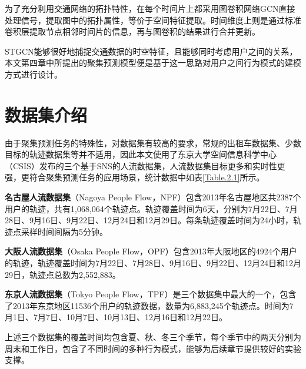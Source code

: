 \documentclass[master]{thesis-uestc}
\begin{document}
为了充分利用交通网络的拓扑特性，在每个时间片上都采用图卷积网络GCN直接处理信号，提取图中的拓扑属性，等价于空间特征提取。时间维度上则是通过标准卷积层提取节点相邻时间片的信息，再与图卷积的结果进行合并更新。

STGCN能够很好地捕捉交通数据的时空特征，且能够同时考虑用户之间的关系，本文第四章中所提出的聚集预测模型便是基于这一思路对用户之间行为模式的建模方式进行设计。

\section{数据集介绍}
由于聚集预测任务的特殊性，对数据集有较高的要求，常规的出租车数据集、少数目标的轨迹数据集等并不适用，因此本文使用了东京大学空间信息科学中心（CSIS）发布的三个基于SNS的人流数据集，人流数据集目标更多和实时性更强，更符合聚集预测任务的应用场景，统计数据中如表\ref{Table.2.1}所示。
\begin{table}[ht]
\centering
\caption{三个基于SNS的人流数据集信息}
\label{Table.2.1}
\end{table}

\textbf{名古屋人流数据集}（Nagoya People Flow，NPF）包含2013年名古屋地区共2387个用户的轨迹，共有1,068,064个轨迹点。轨迹覆盖时间为6天，分别为7月22日、7月28日、9月16日、9月22日、12月24日和12月29日。每条轨迹覆盖时间为24小时，轨迹点采样时间间隔为5分钟。

\textbf{大阪人流数据集}（Osaka People Flow，OPF）包含2013年大阪地区的4924个用户的轨迹，轨迹覆盖时间为7月22日、7月28日、9月16日、9月22日、12月24日和12月29日，轨迹点总数为2,552,883。

\textbf{东京人流数据集}（Tokyo People Flow，TPF）是三个数据集中最大的一个，包含了2013年东京地区11536个用户的轨迹数据，数量为6,883,245个轨迹点。时间为7月1日、7月7日、10月7日、10月13日、12月16日和12月22日。

上述三个数据集的覆盖时间均包含夏、秋、冬三个季节，每个季节中的两天分别为周末和工作日，包含了不同时间的多种行为模式，能够为后续章节提供较好的实验支撑。
\end{document}
